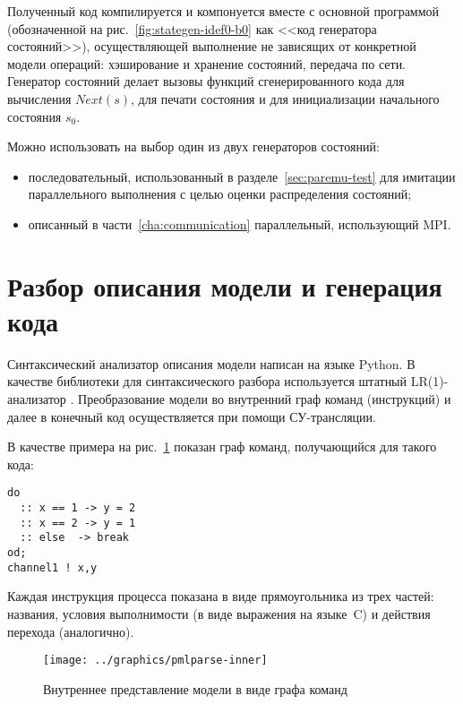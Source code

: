Полученный код компилируется и компонуется вместе с основной программой (обозначенной на
рис.~\ref{fig:stategen-idef0-b0} как <<код генератора состояний>>), осуществляющей выполнение
не зависящих от конкретной модели операций: хэширование и хранение состояний, передача по
сети\etc. Генератор состояний делает вызовы функций сгенерированного кода для вычисления
$Next(s)$, для печати состояния и для инициализации начального состояния $s_0$.

Можно использовать на выбор один из двух генераторов состояний: 

\begin{itemize}
\item последовательный, использованный в разделе~\ref{sec:paremu-test} для имитации параллельного
  выполнения с целью оценки распределения состояний;
\item описанный в части~\ref{cha:communication} параллельный, использующий MPI.
\end{itemize}

\section{Разбор описания модели и генерация кода}
\label{sec:promela-parser}

Синтаксический анализатор описания модели написан на языке Python. В качестве библиотеки
для синтаксического разбора используется штатный LR(1)-анализатор
. Преобразование модели во внутренний граф команд (инструкций) и далее в
конечный код осуществляется при помощи СУ-трансляции.

В качестве примера на рис.~\ref{fig:pmlparse-inner} показан граф команд, получающийся для
такого кода:
\begin{lstlisting}[language=Promela]
do
  :: x == 1 -> y = 2
  :: x == 2 -> y = 1
  :: else  -> break
od;
channel1 ! x,y
\end{lstlisting}

Каждая инструкция процесса показана в виде прямоугольника из трех частей: названия,
условия выполнимости  (в виде выражения на языке~C) и действия перехода
 (аналогично). 

\begin{figure}[ht]
  \centering
  \texttt{[image: ../graphics/pmlparse-inner]}
  \caption{Внутреннее представление модели в виде графа команд}
  \label{fig:pmlparse-inner}
\end{figure}

